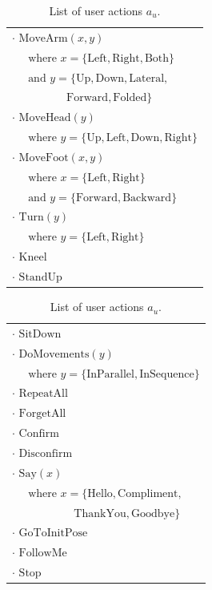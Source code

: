 \begin{table}[ht]
\begin{footnotesize}
\begin{tabular}{p{60mm}} 
$\cdot$ $\mathrm{MoveArm}(x,y) $ \\ $ \ \ \ \ \ \text{ where } x=\{\mathrm{Left,Right,Both}\} $ \\ $ \ \ \ \ \  \text{ and } y = \{\mathrm{Up,Down,Lateral,}$ \\ $\ \ \ \ \ \ \ \ \ \  \ \ \ \ \ \ \ \ \ \ \ \ \mathrm{Forward,Folded}\}$ \\
$\cdot$ $\mathrm{MoveHead}(y) $ \\ $\ \ \ \ \  \text{ where } y = \{\mathrm{Up,Left,Down,Right}\}$ \\
$\cdot$ $\mathrm{MoveFoot}(x,y) $ \\ $\ \ \ \ \  \text{ where } x = \{\mathrm{Left,Right}\} $ \\ $\ \ \ \ \ \text{ and } y = \{\mathrm{Forward,Backward}\}$ \\
$\cdot$ $\mathrm{Turn}(y) $ \\ $\ \ \ \ \ \text{ where } y = \{\mathrm{Left,Right}\}$ \\ 
$\cdot$ $\mathrm{Kneel}$ \\
$\cdot$ $\mathrm{StandUp}$ 
\end{tabular}
\hspace{2cm}
\begin{tabular}{p{60mm}} 
$\cdot$ $\mathrm{SitDown}$ \\
$\cdot$ $\mathrm{DoMovements}(y) $ \\ $ \ \ \ \ \  \text{ where } y = \{\mathrm{InParallel,InSequence}\}$\\
$\cdot$ $\mathrm{RepeatAll}$ \\
$\cdot$ $\mathrm{ForgetAll}$ \\
$\cdot$ $\mathrm{Confirm}$ \\
$\cdot$ $\mathrm{Disconfirm}$ \\
$\cdot$ $\mathrm{Say}(x)$ \\  $ \ \ \ \ \  \text{ where } x = \{\mathrm{Hello, Compliment,}$ \\ $\ \ \ \ \ \ \ \ \ \ \ \ \ \ \ \ \ \ \ \ \ \ \ \ \  \mathrm{ThankYou, Goodbye}\}$\\
$\cdot$ $\mathrm{GoToInitPose}$ \\ 
$\cdot$ $\mathrm{FollowMe}$ \\
$\cdot$ $\mathrm{Stop}$ 
\end{tabular}
\end{footnotesize}
 \caption{List of user actions $a_u$.} 
\label{table:userdas}
\end{table}


